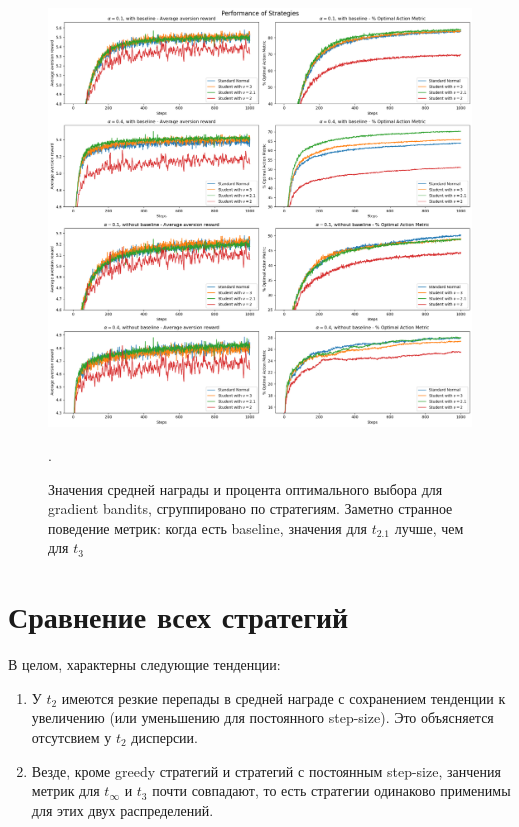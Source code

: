 \begin{figure}[ht!]
    \centering
    \includegraphics[width=1.1\linewidth]{Figures/experiments_classic/gradient_bandits/second.png}
    \caption{\label{fig:gradient_2}Значения средней награды и процента оптимального выбора для gradient bandits, сгруппировано по стратегиям. Заметно странное поведение метрик: когда есть baseline, значения для $t_{2.1}$ лучше, чем для $t_{3}$}.
\end{figure}

\section{Сравнение всех стратегий}

В целом, характерны следующие тенденции:
\begin{enumerate}
    \item У $t_2$ имеются резкие перепады в средней награде с сохранением тенденции к увеличению (или уменьшению для постоянного step-size). Это объясняется отсутсвием у $t_2$ дисперсии.
    \item Везде, кроме greedy стратегий и стратегий с постоянным step-size, занчения метрик для $t_{\infty}$ и $t_3$ почти совпадают, то есть стратегии одинаково применимы для этих двух распределений.
\end{enumerate}

